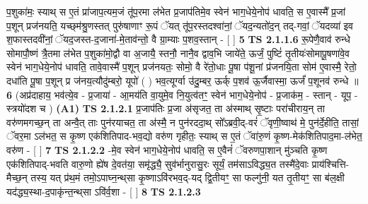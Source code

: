 \documentclass[17pt]{extarticle}
\begin{document}
                  प॒शुका॑मः॒ स्याथ् स ए॒तं प्रा॑जाप॒त्यम॒जं तू॑प॒रमा ल॑भेत प्र॒जाप॑तिमे॒व स्वेन॑ भाग॒धेये॒नोप॑ धावति॒ स ए॒वास्मै᳚ प्र॒जां प॒शून् प्रज॑नयति॒ यच्छ्‌म॑श्रु॒णस्तत् पुरु॑षाणाꣳ रू॒पं ॅयत् तू॑प॒रस्तदश्वा॑नां॒ ॅयद॒न्यतो॑द॒न् तद्-गवां॒ ॅयदव्या॑ इव श॒फास्तदवी॑नां॒ ॅयद॒जस्त-द॒जाना॑-मे॒ताव॑न्तो॒ वै ग्रा॒म्याः प॒शव॒स्तान् - [  ] \textbf{  5} \newline
                  \newline
                                \textbf{ TS 2.1.1.6} \newline
                  रू॒पेणै॒वाव॑ रुन्धे सोमापौ॒ष्णं त्रै॒तमा ल॑भेत प॒शुका॑मो॒द्वौ वा अ॒जायै॒ स्तनौ॒ नानै॒व द्वाव॒भि जाये॑ते॒ ऊर्जं॒ पुष्टिं॑ तृ॒तीयः॑सोमापू॒षणा॑वे॒व स्वेन॑ भाग॒धेये॒नोप॑ धावति॒ तावे॒वास्मै॑ प॒शून् प्रज॑नयतः॒ सोमो॒ वै रे॑तो॒धाः पू॒षा प॑शू॒नां प्र॑जनयि॒ता सोम॑ ए॒वास्मै॒ रेतो॒ दधा॑ति पू॒षा प॒शून् प्र ज॑नय॒त्यौदु॑म्बरो॒ यूपो॑ ( ) भव॒त्यूर्ग्वा उ॑दु॒म्बर॒ ऊर्क् प॒शव॑ ऊ॒र्जैवास्मा॒ ऊर्जं॑ प॒शूनव॑ रुन्धे ॥ \textbf{  6 } \newline
                  \newline
                      (अप्र॑दाहाय॒ भव॑त्ये॒व - प्र॒जाया॑ - आ॒मय॑ति वा॒युमे॒व नि॒युत्व॑तꣳ॒॒ स्वेन॑ भाग॒धेये॒नोप॑ - प्र॒जाक॑म॒ - स्तान् - यूप॒ - स्त्रयो॑दश च )  \textbf{(A1)} \newline \newline
                                        \textbf{ TS 2.1.2.1} \newline
                  प्र॒जाप॑तिः प्र॒जा अ॑सृजत॒ ता अ॑स्माथ् सृ॒ष्टाः परा॑चीराय॒न् ता वरु॑णमगच्छ॒न् ता अन्वै॒त् ताः पुन॑रयाचत॒ ता अ॑स्मै॒ न पुन॑रददा॒थ् सो᳚ऽब्रवी॒द्-वरं॑ ॅवृणी॒ष्वाथ॑ मे॒ पुन॑र्दे॒हीति॒ तासां॒ ॅवर॒मा ऽल॑भत॒ स कृ॒ष्ण एक॑शितिपाद-भव॒द्यो वरु॑ण गृहीतः॒ स्याथ् स ए॒तं ॅवा॑रु॒णं कृ॒ष्ण-मेक॑शितिपाद॒मा-ल॑भेत॒ वरु॑ण - [  ] \textbf{  7 } \newline
                  \newline
                                \textbf{ TS 2.1.2.2} \newline
                  -मे॒व स्वेन॑ भाग॒धेये॒नोप॑ धावति॒ स ए॒वैनं॑ ॅवरुणपा॒शान् मु॑ञ्चति कृ॒ष्ण एक॑शितिपाद्-भवति वारु॒णो ह्ये॑ष दे॒वत॑या॒ समृ॑द्ध्यै॒ सुव॑र्भानुरासु॒रः सूर्यं॒ तम॑साऽविद्ध्य॒त तस्मै॑दे॒वाः प्राय॑श्चित्ति-मैच्छ॒न् तस्य॒ यत् प्र॑थ॒मं तमो॒ऽपाघ्न॒न्थ्‌सा कृ॒ष्णाऽवि॑रभव॒द्-यद् द्वि॒तीयꣳ॒॒ सा फल्गु॑नी॒ यत तृ॒तीयꣳ॒॒ सा ब॑ल॒क्षी यद॑द्ध्य॒स्था-द॒पाकृ॑न्त॒न्थ्‌सा ऽवि॑र्व॒शा - [  ] \textbf{  8} \newline
                  \newline
                                \textbf{ TS 2.1.2.3} \newline
\end{document}
